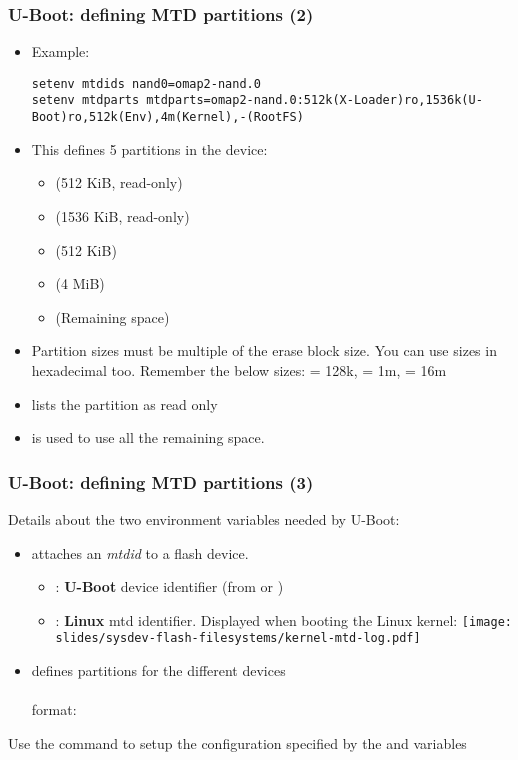 \begin{frame}[fragile]
  \frametitle{U-Boot: defining MTD partitions (2)}
  \begin{itemize}
  \item Example:
  {\tiny
  \begin{verbatim}
setenv mtdids nand0=omap2-nand.0
setenv mtdparts mtdparts=omap2-nand.0:512k(X-Loader)ro,1536k(U-Boot)ro,512k(Env),4m(Kernel),-(RootFS)
  \end{verbatim}
  }
  \item This defines 5 partitions in the  device:
    \begin{itemize}
    \item {} (512 KiB, read-only)
    \item {} (1536 KiB, read-only)
    \item {} (512 KiB)
    \item {} (4 MiB)
    \item {} (Remaining space)
    \end{itemize}
  \item Partition sizes must be multiple of the erase block size.
    You can use sizes in hexadecimal too. Remember the below sizes:
     = 128k,  = 1m,  = 16m
  \item {} lists the partition as read only
  \item \code{-} is used to use all the remaining space.
  \end{itemize}
\end{frame}


\begin{frame}[fragile]
  \frametitle{U-Boot: defining MTD partitions (3)}
  Details about the two environment variables needed by U-Boot:
  \begin{itemize}
  \item {} attaches an {\em mtdid} to a flash device.\\
    \begin{itemize}
    \item {}: {\bf U-Boot} device identifier (from
       or )
    \item {}: {\bf Linux} mtd identifier. Displayed
      when booting the Linux kernel:
    \texttt{[image: slides/sysdev-flash-filesystems/kernel-mtd-log.pdf]}\\
    \end{itemize}
  \item {} defines partitions for the different devices\\
  \\
   format: 
  \end{itemize}
  Use the  command to setup the configuration
  specified by the  and  variables
\end{frame}

